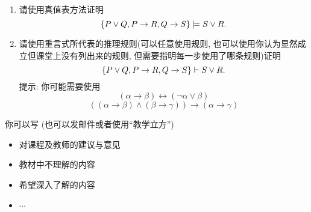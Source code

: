 \documentclass[a4paper, justified]{tufte-handout}
\begin{document}
\begin{solution}
\end{solution}

\begin{problem}[重言蕴含与推理规则 \score{5 = 3 + 2 ($\star\star\star$)}]
  \begin{enumerate}[(1)]
    \item 请使用真值表方法证明
      \[
        \{P \lor Q, P \to R, Q \to S\} \models S \lor R.
      \]
    \item 请使用重言式所代表的推理规则(可以任意使用规则,
      也可以使用你认为显然成立但课堂上没有列出来的规则, 但需要指明每一步使用了哪条规则)证明
      \[
        \{P \lor Q, P \to R, Q \to S\} \vdash S \lor R.
      \]
      提示: 你可能需要使用
      \[
        (\alpha \to \beta) \leftrightarrow (\lnot \alpha \lor \beta)
      \]
      \[
        ((\alpha \to \beta) \land (\beta \to \gamma)) \to (\alpha \to \gamma)
      \]
  \end{enumerate}
\end{problem}

\begin{solution}
\end{solution}


\begincorrection

\beginfb

你可以写 (也可以发邮件或者使用``教学立方'')
\begin{itemize}
  \item 对课程及教师的建议与意见
  \item 教材中不理解的内容
  \item 希望深入了解的内容
  \item $\cdots$
\end{itemize}
\end{document}

